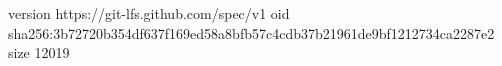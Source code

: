 version https://git-lfs.github.com/spec/v1
oid sha256:3b72720b354df637f169ed58a8bfb57c4cdb37b21961de9bf1212734ca2287e2
size 12019
